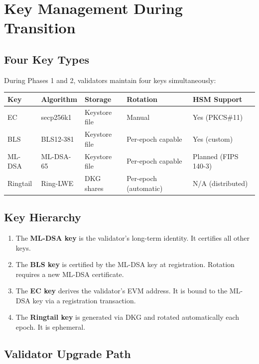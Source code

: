 \documentclass[11pt,a4paper]{article}
\begin{document}
\section{Key Management During Transition}

\subsection{Four Key Types}

During Phases 1 and 2, validators maintain four keys simultaneously:

\begin{center}
\begin{tabular}{lllll}
\toprule
\textbf{Key} & \textbf{Algorithm} & \textbf{Storage} & \textbf{Rotation} & \textbf{HSM Support} \\
\midrule
EC & secp256k1 & Keystore file & Manual & Yes (PKCS\#11) \\
BLS & BLS12-381 & Keystore file & Per-epoch capable & Yes (custom) \\
ML-DSA & ML-DSA-65 & Keystore file & Per-epoch capable & Planned (FIPS 140-3) \\
Ringtail & Ring-LWE & DKG shares & Per-epoch (automatic) & N/A (distributed) \\
\bottomrule
\end{tabular}
\end{center}

\subsection{Key Hierarchy}

\begin{enumerate}[leftmargin=2em]
\item The \textbf{ML-DSA key} is the validator's long-term identity. It certifies all other keys.
\item The \textbf{BLS key} is certified by the ML-DSA key at registration. Rotation requires a new ML-DSA certificate.
\item The \textbf{EC key} derives the validator's EVM address. It is bound to the ML-DSA key via a registration transaction.
\item The \textbf{Ringtail key} is generated via DKG and rotated automatically each epoch. It is ephemeral.
\end{enumerate}

\subsection{Validator Upgrade Path}
\end{document}
